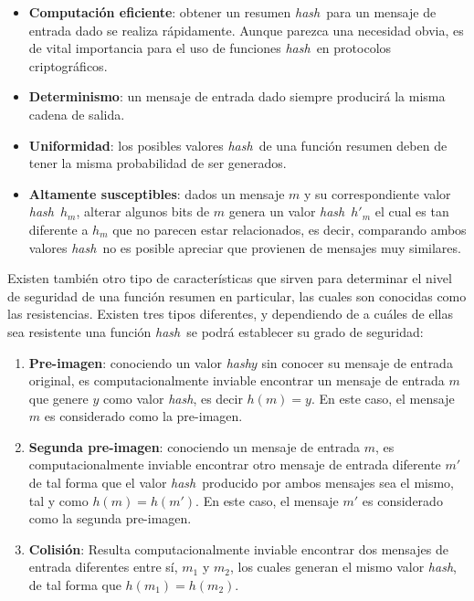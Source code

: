 \documentclass[12pt,spanish,listoffigures,listoftables,listofalgorithms]{tfgetsinf}
\newcommand{\hash}{\textit{hash}}
\begin{document}
\begin{itemize}

	\item \textbf{Computación eficiente}: obtener un resumen \hash~para un mensaje de entrada dado se realiza rápidamente. Aunque parezca una necesidad obvia, es de vital importancia para el uso de funciones \hash~en protocolos criptográficos.

    \item \textbf{Determinismo}: un mensaje de entrada dado siempre producirá la misma cadena de salida.

    \item \textbf{Uniformidad}: los posibles valores \hash~de una función resumen deben de tener la misma probabilidad de ser generados.

    \item \textbf{Altamente susceptibles}: dados un mensaje $m$ y su correspondiente valor \hash~$h_m$, alterar algunos bits de $m$ genera un valor \hash~$h'_m$ el cual es tan diferente a $h_m$ que no parecen estar relacionados, es decir, comparando ambos valores \hash~no es posible apreciar que provienen de mensajes muy similares.

\end{itemize}

Existen también otro tipo de características que sirven para determinar el nivel de seguridad de una función resumen en particular, las cuales son conocidas como las resistencias. Existen tres tipos diferentes, y dependiendo de a cuáles de ellas sea resistente una función \hash~se podrá establecer su grado de seguridad:

\begin{enumerate}

	\item \textbf{Pre-imagen}: conociendo un valor \hash $y$ sin conocer su mensaje de entrada original, es computacionalmente inviable encontrar un mensaje de entrada $m$ que genere $y$ como valor \hash, es decir $h(m) = y$. En este caso, el mensaje $m$ es considerado como la pre-imagen.
 
	\item \textbf{Segunda pre-imagen}: conociendo un mensaje de entrada $m$, es computacionalmente inviable encontrar otro mensaje de entrada diferente $m'$ de tal forma que el valor \hash~producido por ambos mensajes sea el mismo, tal y como $h(m) = h(m')$. En este caso, el mensaje $m'$ es considerado como la segunda pre-imagen.

	\item \textbf{Colisión}: Resulta computacionalmente inviable encontrar dos mensajes de entrada diferentes entre sí, $m_1$ y $m_2$, los cuales generan el mismo valor \hash, de tal forma que $h(m_1) = h(m_2)$.

\end{enumerate}
\end{document}
